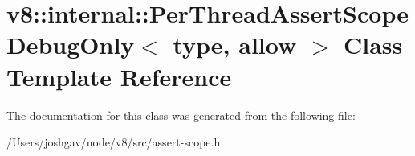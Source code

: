 \hypertarget{classv8_1_1internal_1_1_per_thread_assert_scope_debug_only}{}\section{v8\+:\+:internal\+:\+:Per\+Thread\+Assert\+Scope\+Debug\+Only$<$ type, allow $>$ Class Template Reference}
\label{classv8_1_1internal_1_1_per_thread_assert_scope_debug_only}


The documentation for this class was generated from the following file\+:\begin{DoxyCompactItemize}
\item 
/\+Users/joshgav/node/v8/src/assert-\/scope.\+h\end{DoxyCompactItemize}
